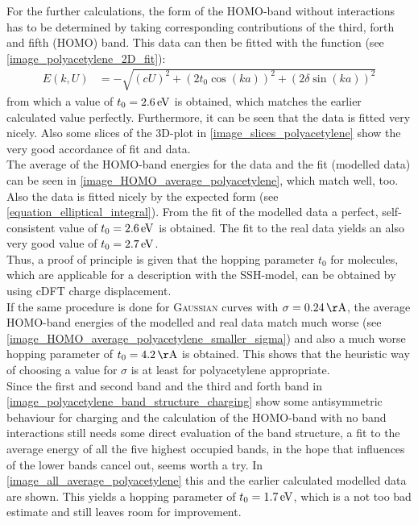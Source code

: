 For the further calculations, the form of the HOMO-band without interactions has to be determined by taking corresponding contributions of the third, forth and fifth (HOMO) band. This data can then be fitted with the function (see \cref{image_polyacetylene_2D_fit}):
\begin{align}
	E(k, U) &= -\sqrt{\left(cU\right)^2 + \left(2t_0\cos(ka)\right)^2+\left(2\delta\sin(ka)\right)^2}
\end{align}
from which a value of $t_0 = \unit[2.6]{eV}$ is obtained, which matches the earlier calculated value perfectly. Furthermore, it can be seen that the data is fitted very nicely. Also some slices of the 3D-plot in \cref{image_slices_polyacetylene} show the very good accordance of fit and data.\\
The average of the HOMO-band energies for the data and the fit (modelled data) can be seen in \cref{image_HOMO_average_polyacetylene}, which match well, too. Also the data is fitted nicely by the expected form (see \cref{equation_elliptical_integral}). From the fit of the modelled data a perfect, self-consistent value of $t_0 = \unit[2.6]{eV}$ is obtained. The fit to the real data yields an also very good value of $t_0 = \unit[2.7]{eV}$.\\
Thus, a proof of principle is given that the hopping parameter $t_0$ for molecules, which are applicable for a description with the SSH-model, can be obtained by using cDFT charge displacement.\\
If the same procedure is done for \textsc{Gaussian} curves with $\sigma = \unit[0.24]{\AA}$, the average HOMO-band energies of the modelled and real data match much worse (see \cref{image_HOMO_average_polyacetylene_smaller_sigma}) and also a much worse hopping parameter of $t_0 = \unit[4.2]{\AA}$ is obtained. This shows that the heuristic way of choosing a value for $\sigma$ is at least for polyacetylene appropriate.\\
Since the first and second band and the third and forth band in \cref{image_polyacetylene_band_structure_charging} show some antisymmetric behaviour for charging and the calculation of the HOMO-band with no band interactions still needs some direct evaluation of the band structure, a fit to the average energy of all the five highest occupied bands, in the hope that influences of the lower bands cancel out, seems worth a try. In \cref{image_all_average_polyacetylene} this and the earlier calculated modelled data are shown. This yields a hopping parameter of $t_0 = \unit[1.7]{eV}$, which is a not too bad estimate and still leaves room for improvement.
